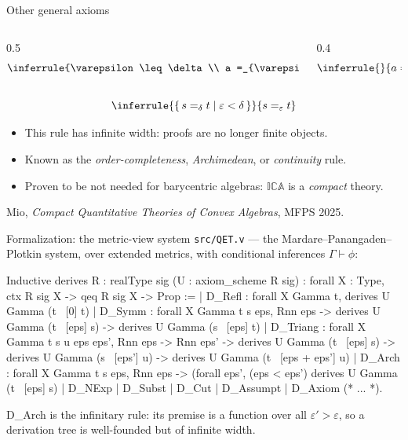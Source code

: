 \documentclass[10pt,aspectratio=169]{beamer}
\newcommand{\qeq}[1]{=_{#1}}
\newcommand{\ICA}{\mathbb{I}\mathbb{C}\mathbb{A}}
\newcommand{\eps}{\varepsilon}
\newcommand{\file}[1]{{\color{rocqcon}\texttt{#1}}}
\newcommand{\rid}[1]{{\ttfamily\small #1}}
\begin{document}
\begin{frame}{Other general axioms}
  \begin{columns}[c]
    \begin{column}{0.5\textwidth}
      \[
        \inferrule{\eps \leq \delta \\ a \qeq{\eps} b}{a \qeq{\delta} b}
      \]
    \end{column}
    \begin{column}{0.4\textwidth}
      \[
        \inferrule{ }{a \qeq{1} b}
      \]
    \end{column}
  \end{columns}
  \vfill\vfill
  \[
    \inferrule{\{\, s \qeq{\delta} t \mid \eps < \delta \,\}}
              {s \qeq{\eps} t}
  \]
  \vfill
  \begin{itemize}
    \item[$\hookrightarrow$] This rule has infinite width: proofs
      are no longer finite objects.
    \item[$\hookrightarrow$] Known as the \emph{order-completeness},
      \emph{Archimedean}, or \emph{continuity} rule.
    \item[$\hookrightarrow$] \alert{Proven to be not needed} for
      barycentric algebras: $\ICA$ is a \emph{compact} theory.
  \end{itemize}
  \vfill
  \hfill{\small Mio, \emph{Compact Quantitative Theories of Convex
  Algebras}, MFPS 2025.}
\end{frame}

\begin{frame}[fragile]{Formalization: the metric-view system}
  \file{src/QET.v} --- the Mardare--Panangaden--Plotkin system, over
  extended metrics, with conditional inferences $\Gamma \vdash \phi$:
  \begin{srcbox}
Inductive derives {R : realType} {sig} (U : axiom_scheme R sig)
    : forall X : Type, ctx R sig X -> qeq R sig X -> Prop :=
  | D_Refl   : forall X Gamma t, derives U Gamma (t ~[0] t)
  | D_Symm   : forall X Gamma t s eps, Rnn eps ->
      derives U Gamma (t ~[eps] s) -> derives U Gamma (s ~[eps] t)
  | D_Triang : forall X Gamma t s u eps eps', Rnn eps -> Rnn eps' ->
      derives U Gamma (t ~[eps] s) -> derives U Gamma (s ~[eps'] u) ->
      derives U Gamma (t ~[eps + eps'] u)
  | D_Arch   : forall X Gamma t s eps, Rnn eps ->
      (forall eps', (eps < eps')%
      derives U Gamma (t ~[eps] s)
  | D_NExp | D_Subst | D_Cut | D_Assumpt | D_Axiom (* ... *).
  \end{srcbox}
  \vfill
  \rid{D\_Arch} is the infinitary rule: its premise is a
  function over all $\eps' > \eps$, so a derivation tree is
  well-founded but of infinite width.
\end{frame}
\end{document}
